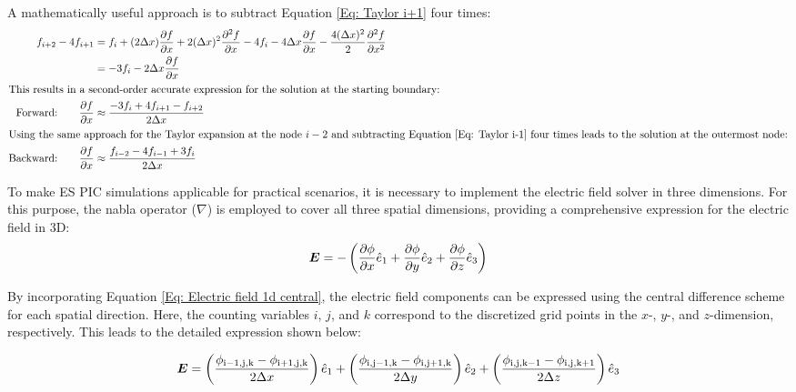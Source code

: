 A mathematically useful approach is to subtract Equation \ref{Eq: Taylor i+1} four times:
\begin{align}
      f_{i+2} - 4 f_{i+1} &=  f_i + (2\Delta x) \frac{\partial f}{\partial x} + 2(\Delta x)^2\frac{\partial^2 f}{\partial x} - 4 f_i -4 \Delta x\frac{\partial f}{\partial x} - \frac{4 (\Delta x)^2}{2} \frac{\partial^2 f}{\partial x^2}\nonumber\\
      &= -3 f_i - 2 \Delta x \frac{\partial f}{\partial x} \\
      \intertext{This results in a second-order accurate expression for the solution at the starting boundary:}
      \text{Forward:} \quad \quad \frac{\partial f}{\partial x} &\approx \frac{-3f_i + 4f_{i+1} - f_{i+2}}{2\Delta x}\\
      \intertext{Using the same approach for the Taylor expansion at the node $i- 2$ and subtracting Equation \ref{Eq: Taylor i-1} four times leads to the solution at the outermost node:}
      \text{Backward:}\quad \quad \frac{\partial f}{\partial x} &\approx \frac{f_{i-2} - 4f_{i-1} + 3f_i}{2\Delta x}
\end{align}

To make \acs{ES PIC} simulations applicable for practical scenarios, it is necessary to implement the electric field solver in three dimensions. For this purpose, the nabla operator ($\nabla$) is employed to cover all three spatial dimensions, providing a comprehensive expression for the electric field in 3D:
\begin{align}
    \bm{E} =  -\left( \frac{\partial \phi}{\partial x} \hat{e}_1 + \frac{\partial \phi}{\partial y} \hat{e}_2 + \frac{\partial \phi}{\partial z} \hat{e}_3 \right)
\end{align}

By incorporating Equation \ref{Eq: Electric field 1d central}, the electric field components can be expressed using the central difference scheme for each spatial direction. Here, the counting variables $i$, $j$, and $k$ correspond to the discretized grid points in the $x$-, $y$-, and $z$-dimension, respectively. This leads to the detailed expression shown below:

\begin{align}
    \bm{E} = \left( \frac{\phi_\mathrm{i-1,j,k} - \phi_\mathrm{i+1,j,k}}{2\Delta x} \right) \hat{e}_1 + \left( \frac{\phi_\mathrm{i,j-1,k} - \phi_\mathrm{i,j+1,k}}{2\Delta y} \right) \hat{e}_2 + \left( \frac{\phi_\mathrm{i,j,k-1} - \phi_\mathrm{i,j,k+1}}{2\Delta z} \right) \hat{e}_3
\end{align}

